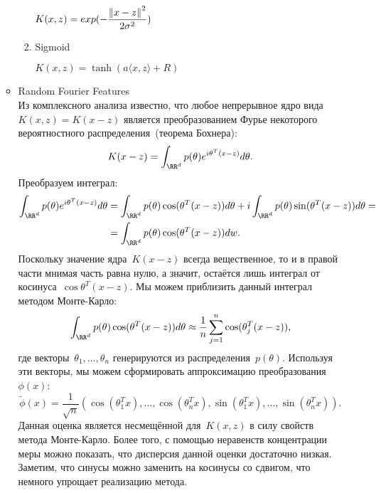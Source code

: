\begin{enumerate}
\begin{itemize}
\begin{enumerate}
                $K(x, z) = exp(- \dfrac{\left\lVert x-z\right\rVert^2}{2\sigma^2})$ \
                \item Sigmoid \
                
                $K(x, z) = \tanh(a\langle x, z \rangle + R)$
            \end{enumerate}
            
            \item Random Fourier Features \\
        Из комплексного анализа известно, что любое непрерывное ядро вида~$K(x, z) = K(x - z)$
является преобразованием Фурье некоторого вероятностного распределения~(теорема Бохнера):
\[
    K(x - z)
    =
    \int_{\RR^d}
        p(\theta)
        e^{i \theta^T (x - z)}
    d\theta.
\]
Преобразуем интеграл:
\begin{align*}
    \int_{\RR^d}
        p(\theta)
        e^{i \theta^T (x - z)}
    d\theta
    &=
    \int_{\RR^d}
        p(\theta)
        \cos(\theta^T (x - z))
    d\theta
    +
    i
    \int_{\RR^d}
        p(\theta)
        \sin(\theta^T (x - z))
    d\theta
    =\\
    &=
    \int_{\RR^d}
        p(\theta)
        \cos(\theta^T (x - z))
    dw.
\end{align*}
Поскольку значение ядра~$K(x - z)$ всегда вещественное,
то и в правой части мнимая часть равна нулю,
а значит, остаётся лишь интеграл от косинуса~$\cos \theta^T (x - z)$.
Мы можем приблизить данный интеграл методом Монте-Карло:
\[
    \int_{\RR^d}
        p(\theta)
        \cos(\theta^T (x - z))
    d\theta
    \approx
    \frac{1}{n}
    \sum_{j = 1}^{n}
        \cos(\theta_j^T (x - z)),
\]
где векторы~$\theta_1, \dots, \theta_n$ генерируются из распределения~$p(\theta)$.
Используя эти векторы, мы можем сформировать аппроксимацию преобразования~$\phi(x)$:
\[
    \tilde \phi(x)
    =
    \frac{1}{\sqrt{n}}
    (\cos(\theta_1^T x), \dots, \cos(\theta_n^T x),
    \sin(\theta_1^T x), \dots, \sin(\theta_n^T x)).
\]
Данная оценка является несмещённой для~$K(x, z)$ в силу свойств метода Монте-Карло.
Более того, с помощью неравенств концентрации меры можно показать, что дисперсия данной оценки достаточно низкая.
Заметим, что синусы можно заменить на косинусы со сдвигом, что немного упрощает реализацию метода.
        \end{itemize}
        
        
\end{enumerate}